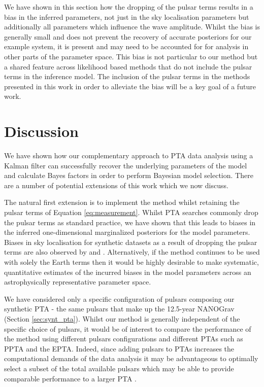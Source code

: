 \documentclass[fleqn,usenatbib,useAMS]{mnras}
\providecommand{\DIFaddbegin}{} %
\providecommand{\DIFaddend}{} %
\newcommand{\DIFaddincludegraphics}[2][]{{\color{blue}\fbox{\DIFOincludegraphics[#1]{#2}}}} %
\DeclareRobustCommand{\DIFaddbegin}{\DIFOaddbegin \let\includegraphics\DIFaddincludegraphics} %
\DeclareRobustCommand{\DIFaddend}{\DIFOaddend \let\includegraphics\DIFOincludegraphics} %
\begin{document}
We have shown in this section how the dropping of the pulsar terms results in a bias in the inferred parameters, not just in the sky localisation parameters  \citep[e.g.][]{Zhupulsarterms,Chen2022} but additionally all parameters which influence the wave amplitude. Whilst the bias is generally small and does not prevent the recovery of accurate posteriors for our example system, it is present and may need to be accounted for for analysis in other parts of the parameter space. This bias is not particular to our method but a shared feature across likelihood based methods that do not include the pulsar terms in the inference model. The inclusion of the pulsar terms in the methods presented in this work in order to alleviate the bias will be a key goal of a future work. 


\section{Discussion}\DIFaddbegin \label{sec:discussion}
\DIFaddend We have shown how our complementary approach to PTA data analysis using a Kalman filter can successfully recover the underlying parameters of the model and calculate Bayes factors in order to perform Bayesian model selection. There are a number of potential extensions of this work which we now discuss.  \newline 

The natural first extension is to implement the method whilst retaining the pulsar terms of Equation \ref{eq:measurement}. Whilst PTA searches commonly drop the pulsar terms as standard practice, we have shown that this leads to biases in the inferred one-dimensional marginalized posteriors for the model parameters. Biases in sky localisation for synthetic datasets as a result of dropping the pulsar terms are also observed by \cite{Zhupulsarterms} and \cite{Chen2022}. Alternatively, if the method continues to be used with solely the Earth terms then it would be highly desirable to make systematic, quantitative estimates of the incurred biases in the model parameters across an astrophysically representative parameter space. \newline 

We have considered only a specific configuration of pulsars composing our synthetic PTA - the same pulsars that make up the 12.5-year NANOGrav (Section \ref{sec:synt_pta}). Whilst our method is generally independent of the specific choice of pulsars, it would be of interest to compare the performance of the method using different pulsars configurations and different PTAs such as PPTA and the EPTA. Indeed, since adding pulsars to PTAs increases the computational demands of the data analysis it may be advantageous to optimally select a subset of the total available pulsars which may be able to provide comparable performance to a larger PTA  \citep{2023MNRAS.518.1802S}.  \newline 
\end{document}
